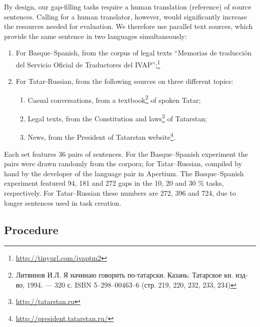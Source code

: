 \documentclass[11pt]{article}
\newcommand{\comment}[1]{}
\newcommand{\rus}[1]{\foreignlanguage{russian}{#1}}
\begin{document}
By design, our gap-filling tasks require a human translation (reference) of source sentences. Calling for a human translator, however, would significantly increase the resources needed for evaluation. We therefore use parallel text sources, which provide the same sentence in two languages simultaneously:
\begin{enumerate}
\item  For Basque--Spanish, from the corpus of legal texts ``Memorias de traducci\'on del
Servicio Oficial de Traductores del IVAP'';\footnote{\url{http://tinyurl.com/ivaptm2}} 
\item  For Tatar-Russian, from the following sources on three different topics:
  \begin{enumerate}
    \item  Casual conversations, from a textbook\footnote{\rus{Литвинов И.Л. Я начинаю говорить по-татарски. Казань: Татарское кн. изд-во, 1994. — 320 с. ISBN 5--298--00463--6 (стр. 219, 220, 232, 233, 234)}} of spoken Tatar;
    \item  Legal texts, from the Constitution and laws\footnote{\url{http://tatarstan.ru}} of Tatarstan;
    \item  News, from the President of Tatarstan website\footnote{\url{http://president.tatarstan.ru/}}.
  \end{enumerate}
\end{enumerate}

Each set features 36 pairs of sentences. For the Basque--Spanish experiment the pairs were drawn
randomly from the corpora; for Tatar--Russian, compiled by hand by the developer of the
language pair in Apertium. The Basque--Spanish experiment featured 94, 181 and 272 gaps in the 10, 20 and 30 \% tasks, respectively. For Tatar--Russian these numbers are 272, 396 and 724, due to longer sentences used in task creation. \comment{EA to JA: Ilnar wanted to test the system on his own sentences, should I put it in the paper?}

\subsection{Procedure}
\end{document}
